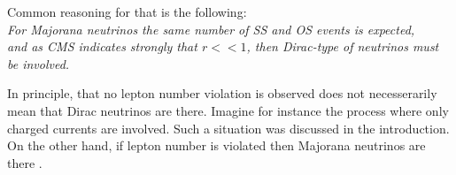 \documentclass[twocolumn,superscriptaddress,showpacs,prl,nofootinbib,floatfix]{revtex4}
\begin{document}

 Common reasoning for that is the following: \\
{\it For Majorana neutrinos the same number of SS and OS events is expected, \\
and as CMS indicates strongly that $r <<1$, then Dirac-type of neutrinos must be involved.} 

In principle, that no lepton number violation is observed does not necesserarily mean that Dirac neutrinos are there. Imagine for instance the process where only charged currents are involved. Such a situation was discussed in the introduction. On the other hand, if lepton number is violated then Majorana neutrinos are there \cite{Schechter:1981cv}.
\end{document}
